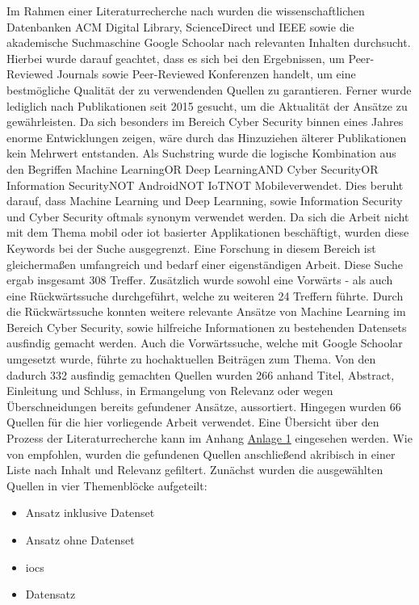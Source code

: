 \documentclass[
    12pt, %
    DIV10,
    ngerman, %
    a4paper, %
    oneside, %
    titlepage, %
    parskip=half, %
    headings=normal, %
    listof=totoc, %
    bibliography=totoc, %
    index=totoc, %
    captions=tableheading, %
    final %
]{scrreprt}
\begin{document}
Im Rahmen einer Literaturrecherche nach \textcite{Webster2002} wurden die wissenschaftlichen Datenbanken ACM Digital Library, ScienceDirect und IEEE sowie die akademische Suchmaschine Google Schoolar nach relevanten Inhalten durchsucht. Hierbei wurde darauf geachtet, dass es sich bei den Ergebnissen, um Peer-Reviewed Journals sowie Peer-Reviewed Konferenzen handelt, um eine bestmögliche Qualität der zu verwendenden Quellen zu garantieren. Ferner wurde lediglich nach Publikationen seit 2015 gesucht, um die Aktualität der Ansätze zu gewährleisten. Da sich besonders im Bereich Cyber Security binnen eines Jahres enorme Entwicklungen zeigen, wäre durch das Hinzuziehen älterer Publikationen kein Mehrwert entstanden. Als Suchstring wurde die logische Kombination aus den Begriffen \glqq Machine Learning\grqq OR \glqq Deep Learning\grqq AND \glqq Cyber Security\grqq OR \glqq Information Security\grqq NOT \glqq Android\grqq NOT \glqq IoT\grqq NOT \glqq Mobile\grqq verwendet. Dies beruht darauf, dass Machine Learning und Deep Learnning, sowie Information Security und Cyber Security oftmals synonym verwendet werden. Da sich die Arbeit nicht mit dem Thema mobil oder \ac{iot} basierter Applikationen beschäftigt, wurden diese Keywords bei der Suche ausgegrenzt. Eine Forschung in diesem Bereich ist gleichermaßen umfangreich und bedarf einer eigenständigen Arbeit. Diese Suche ergab insgesamt 308 Treffer. Zusätzlich wurde sowohl eine Vorwärts - als auch eine Rückwärtssuche durchgeführt, welche zu weiteren 24 Treffern führte. Durch die Rückwärtssuche konnten weitere relevante Ansätze von Machine Learning im Bereich Cyber Security, sowie hilfreiche Informationen zu bestehenden Datensets ausfindig gemacht werden. Auch die Vorwärtssuche, welche mit Google Schoolar umgesetzt wurde, führte zu hochaktuellen Beiträgen zum Thema. Von den dadurch 332 ausfindig gemachten Quellen wurden 266 anhand Titel, Abstract, Einleitung und Schluss, in Ermangelung von Relevanz oder wegen Überschneidungen bereits gefundener Ansätze, aussortiert. Hingegen wurden 66 Quellen für die hier vorliegende Arbeit verwendet. Eine Übersicht über den Prozess der Literaturrecherche kann im Anhang \hyperref[rm]{Anlage 1} eingesehen werden. Wie von \textcite{Webster2002} empfohlen, wurden die gefundenen Quellen anschließend akribisch in einer Liste nach Inhalt und Relevanz gefiltert. Zunächst wurden die ausgewählten Quellen in vier Themenblöcke aufgeteilt:
\begin{itemize}
\item Ansatz inklusive Datenset
\item Ansatz ohne Datenset
\item \ac{iocs}
\item Datensatz
\end{itemize}
\end{document}
